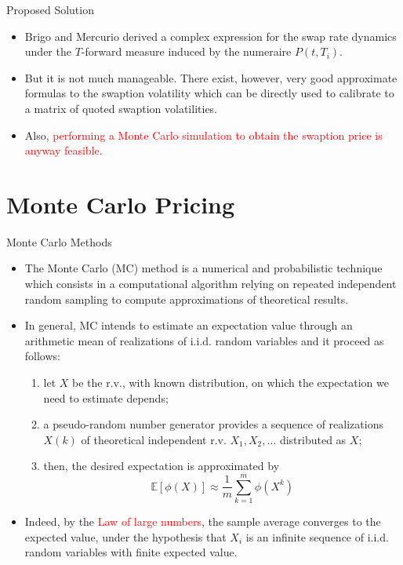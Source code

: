 \documentclass{beamer}
\begin{document}
\begin{frame}{Proposed Solution}
	\begin{itemize}
  \item<1-> Brigo and Mercurio derived a complex expression for the swap rate dynamics under the $T$-forward measure induced by the numeraire $P(t, T_i)$.
  \item<2-> But it is not much manageable. There exist, however, very good approximate formulas to the swaption volatility which can be directly used to calibrate to a matrix of quoted swaption volatilities.  
  \item<3-> Also, \textcolor{red}{performing a Monte Carlo simulation to obtain the swaption price is anyway feasible.} 
  
  \end{itemize}
\end{frame}

\section{Monte Carlo Pricing}
\begin{frame}{Monte Carlo Methods}
  \begin{itemize}
  \item<1-> The Monte Carlo (MC) method is a numerical and probabilistic technique which consists in a computational algorithm relying on repeated independent random sampling to compute approximations of theoretical results.
  \item<2-> In general, MC intends to estimate an expectation value through an arithmetic mean of realizations of i.i.d. random variables and it proceed as follows: 
    \begin{enumerate}
    \item let $X$ be the r.v., with known distribution, on which the expectation we need to estimate depends;
    \item a pseudo-random number generator provides a sequence of realizations $X(k)$ of theoretical independent r.v. $X_1, X_2,\ldots$ distributed as $X$;
    \item then, the desired expectation is approximated by
      \begin{equation*}
	\mathbb{E}[\phi(X)] \approx \frac{1}{m}\sum_{k=1}^m\phi(X^k)
      \end{equation*}
    \end{enumerate}
  \item<3-> Indeed, by the \textcolor{red}{Law of large numbers}, the sample average converges to the expected value, under the hypothesis that $X_i$ is an infinite sequence of i.i.d. random variables with finite expected value.
  \end{itemize}
\end{frame}
\end{document}
